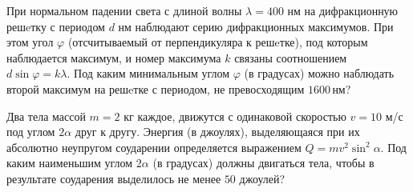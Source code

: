 \begin{consultation}
\begin{listofex}
		\item При нормальном падении света с длиной волны \( \lambda=400 \) нм на дифракционную решeтку с периодом \(d\) нм наблюдают серию дифракционных максимумов. При этом угол \(\varphi\)  (отсчитываемый от перпендикуляра к решeтке), под которым наблюдается максимум, и номер максимума \(k\) связаны соотношением \(d \sin \varphi= k\lambda\). Под каким минимальным углом \(\varphi\) (в градусах) можно наблюдать второй максимум на решeтке с периодом, не превосходящим \(1600\) нм?
		\item Два тела массой \(m=2\) кг каждое, движутся с одинаковой скоростью  \(v =10\) м/с под углом \(2\alpha\) друг к другу. Энергия (в джоулях), выделяющаяся при их абсолютно неупругом соударении определяется выражением \(Q= m v^2 \sin^2 \alpha \). Под каким наименьшим углом \(2\alpha\) (в градусах) должны двигаться тела, чтобы в результате соударения выделилось не менее \(50\) джоулей?
	\end{listofex}
\end{consultation}
